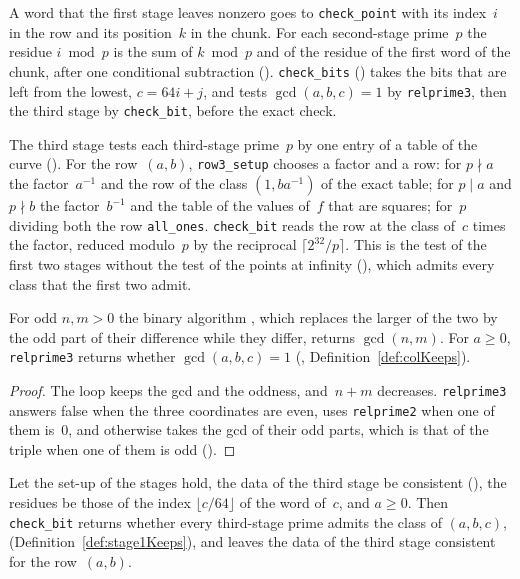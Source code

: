 A word that the first stage leaves nonzero goes to \texttt{check\_point} with its index~$i$ in the
row and its position~$k$ in the chunk. For each second-stage prime~$p$ the residue $i \bmod p$ is
the sum of $k \bmod p$ and of the residue of the first word of the chunk, after one conditional
subtraction (). \texttt{check\_bits} ()
takes the bits that are left from the lowest, $c = 64 i + j$, and tests $\gcd(a, b, c) = 1$ by
\texttt{relprime3}, then the third stage by \texttt{check\_bit}, before the exact check.

The third stage tests each third-stage prime~$p$ by one entry of a table of the curve
(). For the row~$(a, b)$, \texttt{row3\_setup} chooses a factor and a
row: for $p \nmid a$ the factor~$a^{-1}$ and the row of the class $(1, b a^{-1})$ of the exact
table; for $p \mid a$ and $p \nmid b$ the factor~$b^{-1}$ and the table of the values of~$f$ that
are squares; for~$p$ dividing both the row \texttt{all\_ones}. \texttt{check\_bit} reads the row at
the class of~$c$ times the factor, reduced modulo~$p$ by the reciprocal $\lceil 2^{32}/p \rceil$.
This is the test of the first two stages without the test of the points at infinity
(), which admits every class that the first two admit.

\begin{lemma}\label{lem:relprime3_spec}
  \leanok
  For odd $n, m > 0$ the binary algorithm , which replaces the larger of the
  two by the odd part of their difference while they differ, returns $\gcd(n, m)$. For $a \ge 0$,
  \texttt{relprime3} returns whether $\gcd(a, b, c) = 1$ (,
  Definition~\ref{def:colKeeps}).
\end{lemma}

\begin{proof}
  \leanok
  The loop keeps the gcd and the oddness, and~$n + m$ decreases. \texttt{relprime3} answers false
  when the three coordinates are even, uses \texttt{relprime2} when one of them is~$0$, and
  otherwise takes the gcd of their odd parts, which is that of the triple when one of them is odd
  ().
\end{proof}

\begin{lemma}\label{lem:checkBit_spec}
  \leanok
  Let the set-up of the stages hold, the data of the third stage be consistent
  (), the residues be those of the index $\lfloor c/64 \rfloor$ of the
  word of~$c$, and $a \ge 0$. Then \texttt{check\_bit} returns whether every third-stage prime
  admits the class of $(a, b, c)$,  (Definition~\ref{def:stage1Keeps}),
  and leaves the data of the third stage consistent for the row~$(a, b)$.
\end{lemma}

